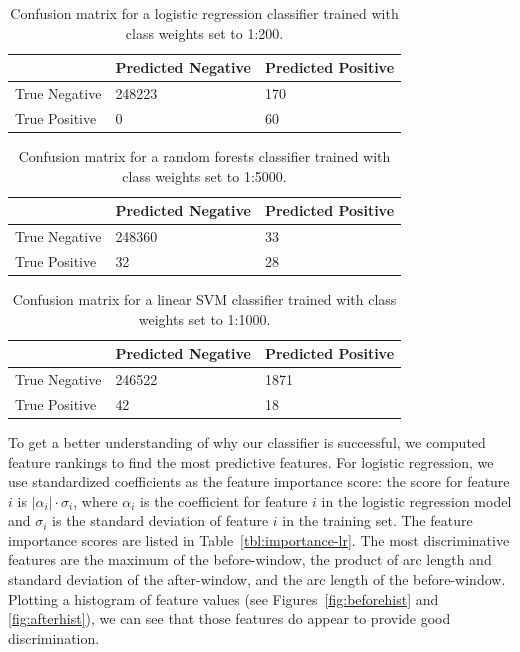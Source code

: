 \documentclass{soups}
\begin{document}
\begin{table}[t]
\centering
\begin{tabular}{@{}lll@{}}
\toprule
              & Predicted Negative & Predicted Positive \\ \midrule
True Negative & 248223             & 170                \\
True Positive & 0                  & 60                 \\ \bottomrule
\end{tabular}
\caption{Confusion matrix for a logistic regression classifier trained
with class weights set to 1:200.}
\label{fig:logistic}
\end{table}

\begin{table}[t]
\centering
\begin{tabular}{@{}lll@{}}
\toprule
              & Predicted Negative & Predicted Positive \\ \midrule
True Negative & 248360             & 33                 \\
True Positive & 32                 & 28                 \\ \bottomrule
\end{tabular}
\caption{Confusion matrix for a random forests classifier trained with
class weights set to 1:5000.}
\label{fig:rf}
\end{table}

\begin{table}[t]
\centering
\begin{tabular}{@{}lll@{}}
\toprule
              & Predicted Negative & Predicted Positive \\ \midrule
True Negative & 246522             & 1871               \\
True Positive & 42                 & 18                 \\ \bottomrule
\end{tabular}
\caption{Confusion matrix for a linear SVM classifier trained with
class weights set to 1:1000.}
\label{fig:svm}
\end{table}


To get a better understanding of why our classifier is successful,
we computed feature rankings to find the most predictive features.
For logistic regression, we use standardized coefficients as the feature importance score:
the score for feature $i$ is $|\alpha_i| \cdot \sigma_i$, where $\alpha_i$ is the coefficient for feature $i$ in the logistic regression model and $\sigma_i$ is the standard deviation of feature $i$ in the training set.
The feature importance scores are listed in Table~\ref{tbl:importance-lr}.
The most discriminative features are
the maximum of the before-window,
the product of arc length and standard deviation of the after-window,
and the arc length of the before-window.
Plotting a histogram of feature values (see Figures~\ref{fig:beforehist} and \ref{fig:afterhist}), we can see that those features do appear to provide good discrimination.
\end{document}

